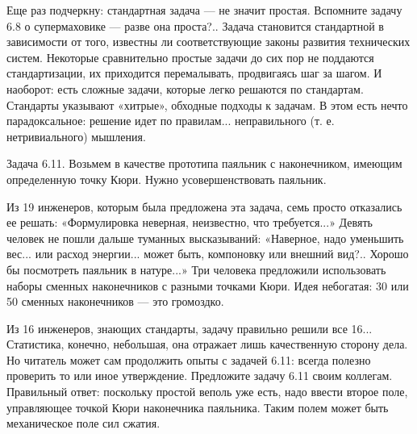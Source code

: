 Еще раз подчеркну:  стандартная задача — не  значит простая. Вспомните
задачу 6.8  о супермаховике  — разве  она проста?..  Задача становится
стандартной в зависимости от  того, известны ли соответствующие законы
развития технических систем. Некоторые  сравнительно простые задачи до
сих  пор  не  поддаются стандартизации,  их  приходится  перемалывать,
продвигаясь шаг  за шагом.  И наоборот:  есть сложные  задачи, которые
легко решаются  по стандартам. Стандарты указывают  «хитрые», обходные
подходы к задачам.  В этом есть нечто парадоксальное:  решение идет по
правилам... неправильного (т. е. нетривиального) мышления.


Задача  6.11. Возьмем  в качестве  прототипа паяльник  с наконечником,
имеющим определенную точку Кюри. Нужно усовершенствовать паяльник.

Из  19 инженеров,  которым  была предложена  эта  задача, семь  просто
отказались   ее  решать:   «Формулировка  неверная,   неизвестно,  что
требуется...» Девять  человек не  пошли дальше  туманных высказываний:
«Наверное,  надо уменьшить  вес... или  расход энергии...  может быть,
компоновку  или  внешний  вид?..   Хорошо  бы  посмотреть  паяльник  в
натуре...»  Три   человека  предложили  использовать   наборы  сменных
наконечников с разными точками Кюри. Идея небогатая: 30 или 50 сменных
наконечников — это громоздко.

Из  16  инженеров,  знающих  стандарты, задачу  правильно  решили  все
16... Статистика,  конечно, небольшая, она отражает  лишь качественную
сторону дела. Но  читатель может сам продолжить опыты  с задачей 6.11:
всегда полезно  проверить то  или иное утверждение.  Предложите задачу
6.11 своим  коллегам. Правильный  ответ: поскольку простой  веполь уже
есть,  надо ввести  второе поле,  управляющее точкой  Кюри наконечника
паяльника. Таким полем может быть механическое поле сил сжатия.


